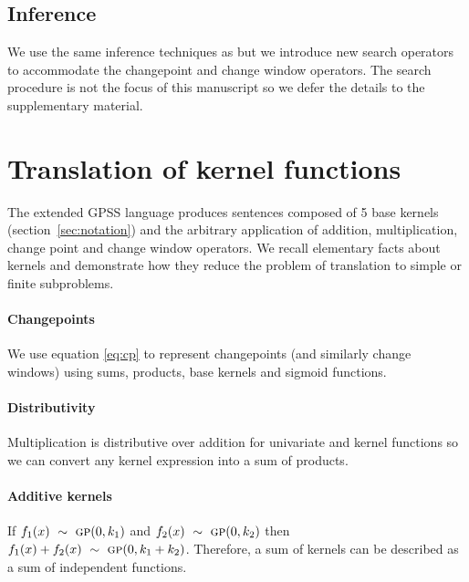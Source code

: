 \documentclass{article}
\begin{document}

\subsection{Inference}

We use the same inference techniques as \cite{DuvLloGroetal13} but we introduce new search operators to accommodate the changepoint and change window operators.
The search procedure is not the focus of this manuscript so we defer the details to the supplementary material.

\section{Translation of kernel functions}
\label{sec:translation}

The extended GPSS language produces sentences composed of 5 base kernels (section~\ref{sec:notation}) and the arbitrary application of addition, multiplication, change point and change window operators. 
We recall elementary facts about kernels and demonstrate how they reduce the problem of translation to simple or finite subproblems.

\paragraph{Changepoints}

We use equation \eqref{eq:cp} to represent changepoints (and similarly change windows) using sums, products, base kernels and sigmoid functions.

\paragraph{Distributivity}

Multiplication is distributive over addition for univariate and kernel functions so we can convert any kernel expression into a sum of products.

\paragraph{Additive kernels}

If $f_1(x) \ \sim\  {\textsc{gp}}{}(0, k_1)$ and $f_2(x) \ \sim\  {\textsc{gp}}{}(0, k_2)$ then $f_1(x) + f_2(x) \ \sim\  {\textsc{gp}}{}(0, k_1 + k_2)$.
Therefore, a sum of kernels can be described as a sum of independent functions.
\end{document}
